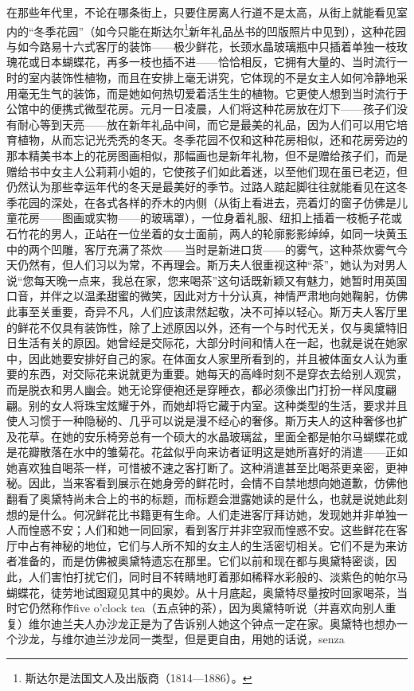 \par 在那些年代里，不论在哪条街上，只要住房离人行道不是太高，从街上就能看见室内的“冬季花园”（如今只能在斯达尔\footnote{斯达尔是法国文人及出版商（1814—1886）。}新年礼品丛书的凹版照片中见到），这种花园与如今路易十六式客厅的装饰——极少鲜花，长颈水晶玻璃瓶中只插着单独一枝玫瑰花或日本蝴蝶花，再多一枝也插不进——恰恰相反，它拥有大量的、当时流行一时的室内装饰性植物，而且在安排上毫无讲究，它体现的不是女主人如何冷静地采用毫无生气的装饰，而是她如何热切爱着活生生的植物。它更使人想到当时流行于公馆中的便携式微型花房。元月一日凌晨，人们将这种花房放在灯下——孩子们没有耐心等到天亮——放在新年礼品中间，而它是最美的礼品，因为人们可以用它培育植物，从而忘记光秃秃的冬天。冬季花园不仅和这种花房相似，还和花房旁边的那本精美书本上的花房图画相似，那幅画也是新年礼物，但不是赠给孩子们，而是赠给书中女主人公莉莉小姐的，它使孩子们如此着迷，以至他们现在虽已老迈，但仍然认为那些幸运年代的冬天是最美好的季节。过路人踮起脚往往就能看见在这冬季花园的深处，在各式各样的乔木的内侧（从街上看进去，亮着灯的窗子仿佛是儿童花房——图画或实物——的玻璃罩），一位身着礼服、纽扣上插着一枝栀子花或石竹花的男人，正站在一位坐着的女士面前，两人的轮廓影影绰绰，如同一块黄玉中的两个凹雕，客厅充满了茶炊——当时是新进口货——的雾气，这种茶炊雾气今天仍然有，但人们习以为常，不再理会。斯万夫人很重视这种“茶”，她认为对男人说“您每天晚一点来，我总在家，您来喝茶”这句话既新颖又有魅力，她暂时用英国口音，并伴之以温柔甜蜜的微笑，因此对方十分认真，神情严肃地向她鞠躬，仿佛此事至关重要，奇异不凡，人们应该肃然起敬，决不可掉以轻心。斯万夫人客厅里的鲜花不仅具有装饰性，除了上述原因以外，还有一个与时代无关，仅与奥黛特旧日生活有关的原因。她曾经是交际花，大部分时间和情人在一起，也就是说在她家中，因此她要安排好自己的家。在体面女人家里所看到的，并且被体面女人认为重要的东西，对交际花来说就更为重要。她每天的高峰时刻不是穿衣去给别人观赏，而是脱衣和男人幽会。她无论穿便袍还是穿睡衣，都必须像出门打扮一样风度翩翩。别的女人将珠宝炫耀于外，而她却将它藏于内室。这种类型的生活，要求并且使人习惯于一种隐秘的、几乎可以说是漫不经心的奢侈。斯万夫人的这种奢侈也扩及花草。在她的安乐椅旁总有一个硕大的水晶玻璃盆，里面全都是帕尔马蝴蝶花或是花瓣散落在水中的雏菊花。花盆似乎向来访者证明这是她所喜好的消遣——正如她喜欢独自喝茶一样，可惜被不速之客打断了。这种消遣甚至比喝茶更亲密，更神秘。因此，当来客看到展示在她身旁的鲜花时，会情不自禁地想向她道歉，仿佛他翻看了奥黛特尚未合上的书的标题，而标题会泄露她读的是什么，也就是说她此刻想的是什么。何况鲜花比书籍更有生命。人们走进客厅拜访她，发现她并非单独一人而惶惑不安；人们和她一同回家，看到客厅并非空寂而惶惑不安。这些鲜花在客厅中占有神秘的地位，它们与人所不知的女主人的生活密切相关。它们不是为来访者准备的，而是仿佛被奥黛特遗忘在那里。它们以前和现在都与奥黛特密谈，因此，人们害怕打扰它们，同时目不转睛地盯着那如稀释水彩般的、淡紫色的帕尔马蝴蝶花，徒劳地试图窥见其中的奥妙。从十月底起，奥黛特尽量按时回家喝茶，当时它仍然称作five o'clock tea（五点钟的茶），因为奥黛特听说（并喜欢向别人重复）维尔迪兰夫人办沙龙正是为了告诉别人她这个钟点一定在家。奥黛特也想办一个沙龙，与维尔迪兰沙龙同一类型，但是更自由，用她的话说，senza 